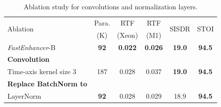 \begin{table}[htp]
    \vspace{-10pt}
    \caption{Ablation study for convolutions and normalization layers.}
    \label{table:ablation}
    \centering
    \setlength{\tabcolsep}{3.5pt}
    \begin{tabular}{l|c|c|c|c|c}
        \hline
        \multirow{2}{*}{Ablation} & Para. & RTF & RTF & \multirow{2}{*}{SISDR} & \multirow{2}{*}{STOI} \\
         & (K) & (Xeon) & (M1) & & \\
        \hline
        \textit{FastEnhancer}-B & \textbf{92} & \textbf{0.022} & \textbf{0.026} & \textbf{19.0} & \textbf{94.5} \\
        \hline
        \textbf{Convolution} & & & & & \\
        \quad Time-axis kernel size 3 & 187 & 0.028 & 0.037 & \textbf{19.0} & \textbf{94.5} \\
        \hline
        \textbf{Replace BatchNorm to} & & & & \\
        \quad LayerNorm & \textbf{92} & 0.028 & 0.029 & 18.9 & \textbf{94.5} \\
        \hline
    \end{tabular}
\end{table}
